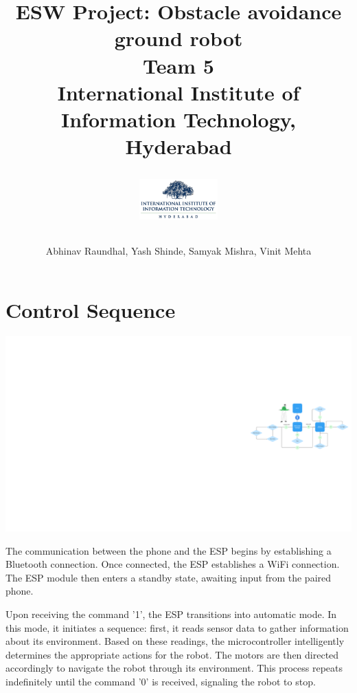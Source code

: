 \documentclass{article}
\begin{document}
\title{
    {ESW Project: Obstacle avoidance ground robot}\\
    {Team 5}\\
    {\large International Institute of Information Technology, Hyderabad}\\
    \author{Abhinav Raundhal, Yash Shinde, Samyak Mishra, Vinit Mehta}
    \vspace{1cm}
    \includegraphics[width=3cm]{IIITH.png}
}
\date{}

\maketitle

\section{Control Sequence}
    \begin{center}
    \includegraphics[width=15cm]{flowchart.pdf}
    \end{center}
    The communication between the phone and the ESP begins by establishing a Bluetooth connection. Once connected, the ESP establishes a WiFi connection. The ESP module then enters a standby state, awaiting input from the paired phone.

    Upon receiving the command '1', the ESP transitions into automatic mode. In this mode, it initiates a sequence: first, it reads sensor data to gather information about its environment. Based on these readings, the microcontroller intelligently determines the appropriate actions for the robot. The motors are then directed accordingly to navigate the robot through its environment. This process repeats indefinitely until the command '0' is received, signaling the robot to stop.
\end{document}
